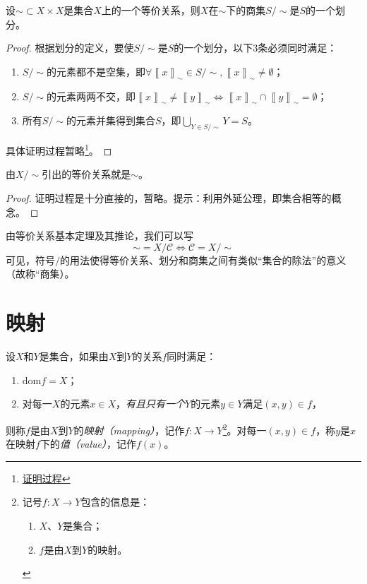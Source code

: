 \documentclass[../main.tex]{subfiles}
\begin{document}
\begin{theorem}[等价关系基本定理]\label{thm:II.1.1}
    设$\sim\subset X\times X$是集合$X$上的一个等价关系，则$X$在$\sim$下的商集$S/\sim$是$S$的一个划分。
\end{theorem}
\begin{proof}
    根据划分的定义，要使$S/\sim$是$S$的一个划分，以下3条必须同时满足：
    \begin{enumerate}
        \item $S/\sim$的元素都不是空集，即$\forall\left\llbracket x\right\rrbracket_\sim\in S/\sim,\left\llbracket x\right\rrbracket_\sim\neq\emptyset$；
        \item $S/\sim$的元素两两不交，即$\left\llbracket x\right\rrbracket_\sim\neq\left\llbracket y\right\rrbracket_\sim\Leftrightarrow\left\llbracket x\right\rrbracket_\sim\cap\left\llbracket y\right\rrbracket_\sim=\emptyset$；
        \item 所有$S/\sim$的元素并集得到集合$S$，即$\bigcup_{Y\in S/\sim}Y=S$。
    \end{enumerate}
    具体证明过程暂略\footnote{\href{https://proofwiki.org/wiki/Fundamental_Theorem_on_Equivalence_Relations}{证明过程}}。
\end{proof}
\begin{corollary}
    由$X/\sim$引出的等价关系就是$\sim$。
\end{corollary}
\begin{proof}
    证明过程是十分直接的，暂略。提示：利用外延公理，即集合相等的概念。
\end{proof}

由等价关系基本定理及其推论，我们可以写
\[
    \sim=X/\mathcal{C}\Leftrightarrow \mathcal{C}=X/\sim
\]
可见，符号$/$的用法使得等价关系、划分和商集之间有类似“集合的除法”的意义（故称“商集）。


\section{映射}
\begin{definition}[映射]\label{def:II.1.3}
    设$X$和$Y$是集合，如果由$X$到$Y$的关系$f$同时满足：
    \begin{enumerate}
        \item $\mathrm{dom}f=X$；
        \item 对每一$X$的元素$x\in X$，\emph{有且只有一个}$Y$的元素$y\in Y$满足$\left(x,y\right)\in f$，
    \end{enumerate}
    则称$f$是由$X$到$Y$的\emph{映射（mapping）}，记作$f:X\rightarrow Y$\footnote{记号$f:X\rightarrow Y$包含的信息是：
        \begin{enumerate}
            \item $X$、$Y$是集合；
            \item $f$是由$X$到$Y$的映射。
        \end{enumerate}
    }。对每一$\left(x,y\right)\in f$，称$y$是$x$在映射$f$下的\emph{值（value）}，记作$f\left(x\right)$。
\end{definition}
\end{document}
